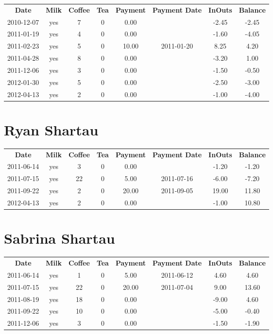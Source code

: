 \begin{center}
\begin{tabular}{cccccccc}
\textbf{Date} & \textbf{Milk} & \textbf{Coffee} & \textbf{Tea} & \textbf{Payment} & \textbf{Payment Date} & \textbf{InOuts} & \textbf{Balance} \\
2010-12-07 & yes & 7 & 0 &  0.00 &  & -2.45 & -2.45\\ 
2011-01-19 & yes & 4 & 0 &  0.00 &  & -1.60 & -4.05\\ 
2011-02-23 & yes & 5 & 0 & 10.00 & 2011-01-20 &  8.25 &  4.20\\ 
2011-04-28 & yes & 8 & 0 &  0.00 &  & -3.20 &  1.00\\ 
2011-12-06 & yes & 3 & 0 &  0.00 &  & -1.50 & -0.50\\ 
2012-01-30 & yes & 5 & 0 &  0.00 &  & -2.50 & -3.00\\ 
2012-04-13 & yes & 2 & 0 &  0.00 &  & -1.00 & -4.00
\end{tabular}
\end{center}

\section{Ryan Shartau}

\begin{center}
\begin{tabular}{cccccccc}
\textbf{Date} & \textbf{Milk} & \textbf{Coffee} & \textbf{Tea} & \textbf{Payment} & \textbf{Payment Date} & \textbf{InOuts} & \textbf{Balance} \\
2011-06-14 & yes &  3 & 0 &  0.00 &  & -1.20 & -1.20\\ 
2011-07-15 & yes & 22 & 0 &  5.00 & 2011-07-16 & -6.00 & -7.20\\ 
2011-09-22 & yes &  2 & 0 & 20.00 & 2011-09-05 & 19.00 & 11.80\\ 
2012-04-13 & yes &  2 & 0 &  0.00 &  & -1.00 & 10.80
\end{tabular}
\end{center}

\section{Sabrina Shartau}

\begin{center}
\begin{tabular}{cccccccc}
\textbf{Date} & \textbf{Milk} & \textbf{Coffee} & \textbf{Tea} & \textbf{Payment} & \textbf{Payment Date} & \textbf{InOuts} & \textbf{Balance} \\
2011-06-14 & yes &  1 & 0 &  5.00 & 2011-06-12 &  4.60 &  4.60\\ 
2011-07-15 & yes & 22 & 0 & 20.00 & 2011-07-04 &  9.00 & 13.60\\ 
2011-08-19 & yes & 18 & 0 &  0.00 &  & -9.00 &  4.60\\ 
2011-09-22 & yes & 10 & 0 &  0.00 &  & -5.00 & -0.40\\ 
2011-12-06 & yes &  3 & 0 &  0.00 &  & -1.50 & -1.90
\end{tabular}
\end{center}


